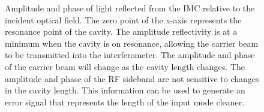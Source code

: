 \begin{figure}[h!]
\centering

\caption[Reflection at the IMC]{Amplitude and phase of light reflected from %
         the IMC relative to the incident optical field. The zero point of the x-axis %
         represents the resonance point of the cavity. The amplitude reflectivity %
         is at a minimum when the cavity is on resonance, allowing the carrier beam %
         to be transmitted into the interferometer. The amplitude and phase of the %
         carrier beam will change as the cavity length changes. The amplitude %
         and phase of the RF sideband are not sensitive to changes in the cavity %
         length. This information can be used to generate an error signal that %
         represents the length of the input mode cleaner.}
\label{fig:imc-reflection}
\end{figure}

